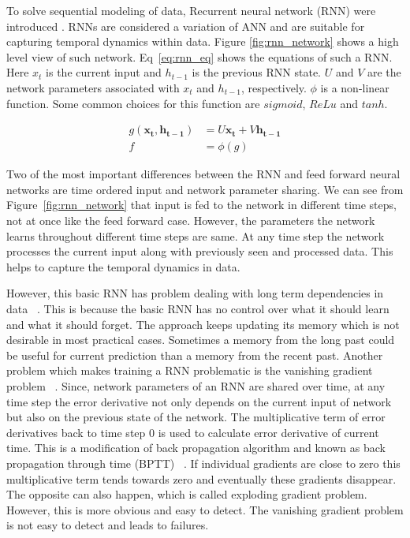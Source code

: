 \documentclass[10pt,twocolumn,letterpaper]{article}
\begin{document}
To solve sequential modeling of data, Recurrent neural network (RNN) were 
introduced \cite{DBLP:journals/corr/Lipton15}. RNNs are considered a  variation of ANN and are 
suitable for capturing temporal dynamics within 
data. Figure \ref{fig:rnn_network} shows a high level view of such network. 
Eq~\ref{eq:rnn_eq} shows the equations of such a  RNN. Here $x_t$ is the current input and $h_{t-1}$ is the previous RNN state. $U$ and $V$ are the network parameters associated with $x_t$ and $h_{t-1}$,
respectively. $\phi$ is a non-linear function. Some common choices for this function are $sigmoid$, $ReLu$ and $tanh$. 

\begin{equation}
\label{eq:rnn_eq}
\begin{aligned}
g(\mathbf{x_t}, \mathbf{h_{t-1}}) & = U\mathbf{x_t} + V\mathbf{h_{t-1}} \\ f & = \phi(g)
\end{aligned}
\end{equation} 

Two of the most important differences between the 
RNN and feed forward neural networks are time ordered input and network parameter sharing. We can see 
from Figure~\ref{fig:rnn_network} that input is fed to the network in different time steps, not at once like 
the feed forward case. However,
the parameters the network learns throughout different time steps are same. At any time step the network processes the 
current input along with 
previously seen and processed data. This helps to capture the temporal dynamics in data. 


However, this 
basic RNN has problem dealing with long term dependencies in data ~\cite{DBLP:journals/corr/abs-1211-5063}. This is because the 
basic RNN has no control over what it should learn and what it 
should forget. The approach keeps updating its memory which is not desirable in most practical cases. Sometimes a memory from the 
long past could be useful for current prediction than a memory from the recent past. Another problem which makes training a RNN problematic 
is the  vanishing gradient problem ~\cite{DBLP:journals/corr/abs-1211-5063}. Since,  network parameters of an RNN are shared over time, at any time step the error derivative not only depends on the current input of network but also on the previous state of the network. The 
multiplicative term of error derivatives back to time step $0$ is used 
to calculate error derivative of current time. This is a modification of back propagation algorithm and known as
back propagation through time (BPTT) ~\cite{58337}. If individual gradients are close to zero this multiplicative term tends towards 
zero and eventually these 
gradients disappear. The opposite can also happen, which is called exploding gradient problem.  However,
this is more obvious and easy to detect. The vanishing gradient problem is not easy to detect and leads to failures. 
\end{document}
